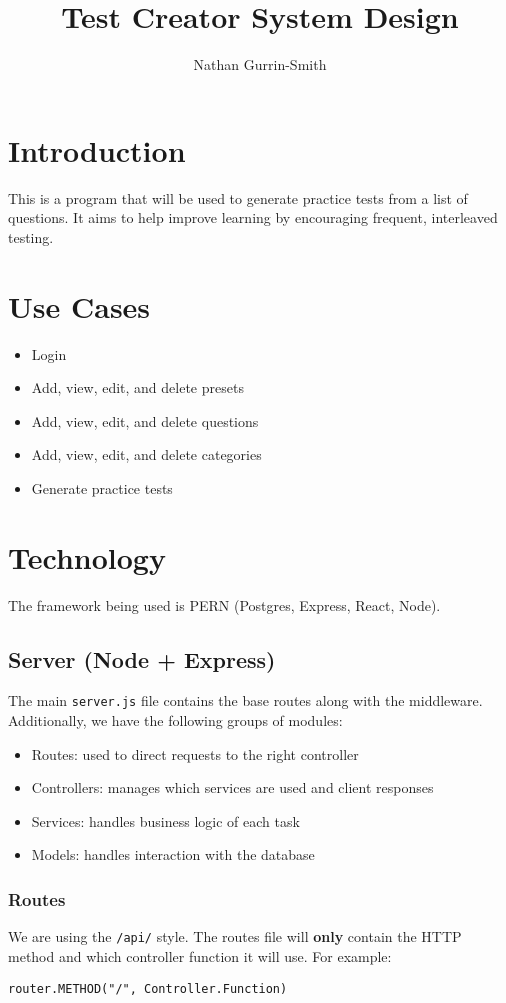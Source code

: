 \documentclass{article}
\title{Test Creator System Design}
\author{Nathan Gurrin-Smith}
\begin{document}
\maketitle

\section{Introduction}
This is a program that will be used to generate practice tests from a list of questions. It aims to help improve learning by encouraging frequent, interleaved testing.

\section{Use Cases}
\begin{itemize}
    \item Login
    \item Add, view, edit, and delete presets
    \item Add, view, edit, and delete questions
    \item Add, view, edit, and delete categories
    \item Generate practice tests
\end{itemize}

\section{Technology}
The framework being used is PERN (Postgres, Express, React, Node).

\subsection{Server (Node + Express)}
The main \texttt{server.js} file contains the base routes along with the middleware. Additionally, we have the following groups of modules:
\begin{itemize}
    \item Routes: used to direct requests to the right controller
    \item Controllers: manages which services are used and client responses
    \item Services: handles business logic of each task
    \item Models: handles interaction with the database
\end{itemize}

\subsubsection*{Routes}
We are using the \texttt{/api/} style. The routes file will \textbf{only} contain the HTTP method and which controller function it will use. For example:
\begin{center}
    \texttt{router.METHOD("/", Controller.Function)}
\end{center}
\end{document}
